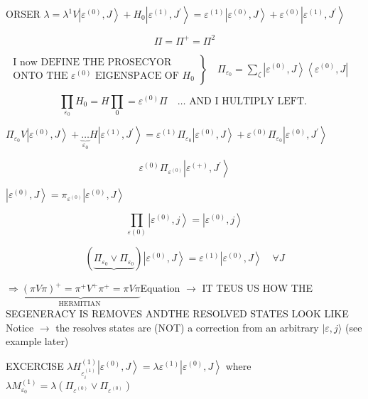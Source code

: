 ORSER $\lambda=\lambda^{1}$\n$V\left|\varepsilon^{(0)}, J\right\rangle+H_{0}\left|\varepsilon^{(1)}, J^{\prime}\right\rangle=\varepsilon^{(1)}\left|\varepsilon^{(0)}, J\right\rangle+\varepsilon^{(0)}\left|\varepsilon^{(1)}, J^{\prime}\right\rangle$

$$
\Pi=\Pi^{+}=\Pi^{2}
$$

$\left.\begin{array}{l}\text { I now DEFINE THE PROSECYOR } \\ \text { ONTO THE } \varepsilon^{(0)} \text { EIGENSPACE OF } H_{0}\end{array}\right\} \quad \Pi_{\varepsilon_{0}}=\sum_{\zeta}\left|\varepsilon^{(0)}, J\right\rangle\left\langle\varepsilon^{(0)}, J\right|$

$$
\prod_{\varepsilon_{0}} H_{0}=H \prod_{0}=\varepsilon^{(0)} \Pi \quad \ldots \text { AND I HULTIPLY LEFT. } 
$$

$\Pi_{\varepsilon_{0}} V\left|\varepsilon^{(0)}, J\right\rangle+\underbrace{\ldots}_{\varepsilon_{0}} H\left|\varepsilon^{(1)}, J^{\prime}\right\rangle=\varepsilon^{(1)} \Pi_{\varepsilon_{0}}\left|\varepsilon^{(0)}, J\right\rangle+\varepsilon^{(0)} \Pi_{\varepsilon_{0}}\left|\varepsilon^{(0)}, J^{\prime}\right\rangle$

$$
\varepsilon^{(0)} \Pi_{\varepsilon^{(0)}}\left|\varepsilon^{(+)}, J^{\prime}\right\rangle
$$

$\left|\varepsilon^{(0)}, J\right\rangle=\pi_{\varepsilon^{(0)}}\left|\varepsilon^{(0)}, J\right\rangle$

$$
\prod_{\varepsilon(0)}\left|\varepsilon^{(0)}, j\right\rangle=\left|\varepsilon^{(0)}, j\right\rangle
$$

$$
(\underbrace{\Pi_{\varepsilon_{0}} \vee \Pi_{\varepsilon_{0}}})\left|\varepsilon^{(0)}, J\right\rangle=\varepsilon^{(1)}\left|\varepsilon^{(0)}, J\right\rangle \quad \forall J
$$

$\Rightarrow \underbrace{(\pi V \pi)^{+}=\pi^{+} V^{+} \pi^{+}=\pi V \pi}_{\text {HERMITIAN }}$\nEigenvalue Equation
$\rightarrow$ IT TEUS US HOW THE SEGENERACY IS REMOVES AND\nHOW THE RESOLVED STATES LOOK LIKE
Notice $\rightarrow$ the resolves states are (NOT) a correction from an arbitrary $|\varepsilon, j\rangle$ (see example later)

EXCERCISE
$\lambda H_{\varepsilon_{i}^{(1)}}^{(1)}\left|\varepsilon^{(0)}, J\right\rangle=\lambda \varepsilon^{(1)}\left|\varepsilon^{(0)}, J\right\rangle$
where $\lambda M_{\varepsilon_{0}}^{(1)}=\lambda\left(\Pi_{\varepsilon^{(0)}} \vee \Pi_{\varepsilon^{(0)}}\right)$

